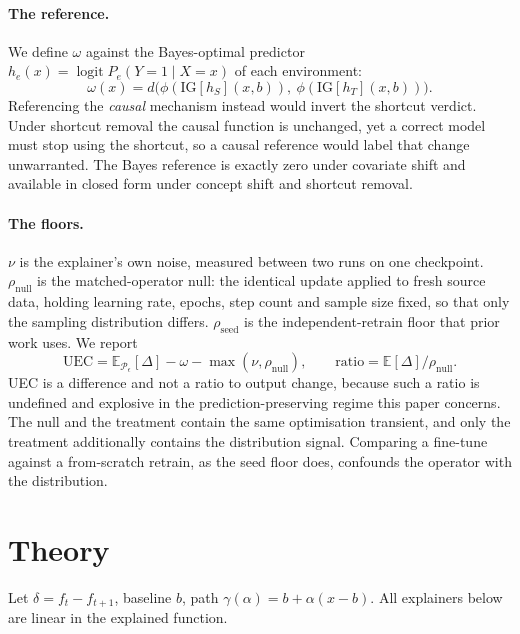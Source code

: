\documentclass{article}
\newcommand{\rnull}{\rho_{\mathrm{null}}}
\newcommand{\rseed}{\rho_{\mathrm{seed}}}
\begin{document}
\paragraph{The reference.} We define $\omega$ against the Bayes-optimal predictor
$h_e(x)=\operatorname{logit}P_e(Y{=}1\mid X{=}x)$ of each environment:
\begin{equation}
\omega(x)=d\big(\phi(\mathrm{IG}[h_S](x,b)),\ \phi(\mathrm{IG}[h_T](x,b))\big).
\end{equation}
Referencing the \emph{causal} mechanism instead would invert the shortcut verdict. Under shortcut
removal the causal function is unchanged, yet a correct model must stop using the shortcut, so a
causal reference would label that change unwarranted. The Bayes reference is exactly zero under
covariate shift and available in closed form under concept shift and shortcut removal.

\paragraph{The floors.}
\label{sec:controls}
$\nu$ is the explainer's own noise, measured between two runs on one checkpoint. $\rnull$ is the
matched-operator null: the identical update applied to fresh source data, holding learning rate,
epochs, step count and sample size fixed, so that only the sampling distribution differs. $\rseed$ is
the independent-retrain floor that prior work uses. We report
\begin{equation}
\mathrm{UEC}=\textstyle\mathbb{E}_{\mathcal{P}_\epsilon}[\Delta]-\omega-\max(\nu,\rnull),
\qquad \text{ratio}=\mathbb{E}[\Delta]/\rnull .
\end{equation}
UEC is a difference and not a ratio to output change, because such a ratio
\citep{agarwal2022ros} is undefined and explosive in the prediction-preserving regime this paper
concerns. The null and the treatment contain the same optimisation transient, and only the treatment
additionally contains the distribution signal. Comparing a fine-tune against a from-scratch retrain,
as the seed floor does, confounds the operator with the distribution.

\section{Theory}
\label{sec:theory}

Let $\delta=f_t-f_{t+1}$, baseline $b$, path $\gamma(\alpha)=b+\alpha(x-b)$. All explainers below are
linear in the explained function.
\end{document}
